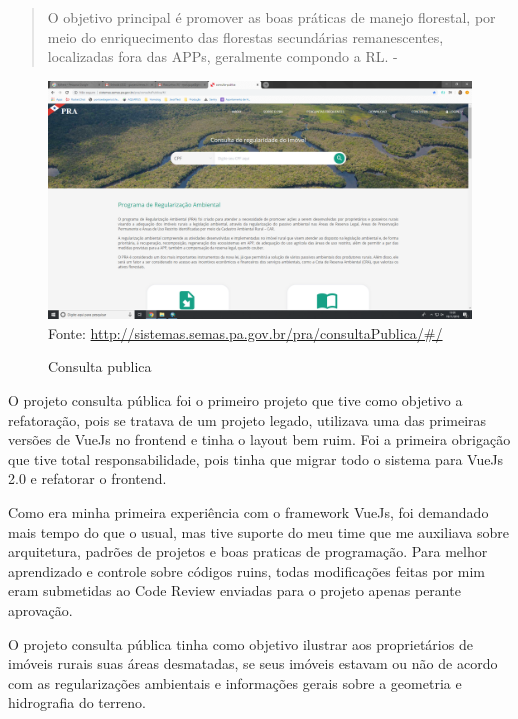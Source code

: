 \begin{quote}
    O objetivo principal é promover as boas
    práticas de manejo florestal, por meio do enriquecimento das florestas secundárias
    remanescentes, localizadas fora das APPs, geralmente compondo a RL. - \cite{de2015cadastro}
\end{quote}
\begin{figure}[H]
\centering
\caption{Consulta publica} %
\includegraphics[scale=0.22]{consulta-publica}\\  %
{\small Fonte: \url{http://sistemas.semas.pa.gov.br/pra/consultaPublica/#/}} %
\label{fig:exemplo} %
\end{figure}

O projeto consulta pública foi o primeiro projeto que tive como objetivo a refatoração, pois se tratava de um projeto legado, utilizava uma das primeiras versões de VueJs no frontend e tinha o layout bem ruim.
Foi a primeira obrigação que tive total responsabilidade, pois tinha que migrar todo o sistema para VueJs 2.0 e refatorar o frontend.

Como era minha primeira experiência com o framework VueJs, foi demandado mais tempo do que o usual, mas tive suporte do meu time que me auxiliava sobre arquitetura, padrões de projetos e boas praticas de programação.
Para melhor aprendizado e controle sobre códigos ruins, todas modificações feitas por mim eram submetidas ao Code Review enviadas para o projeto apenas perante aprovação. 

O projeto consulta pública tinha como objetivo ilustrar aos proprietários de imóveis rurais suas áreas desmatadas, se seus imóveis estavam ou não de acordo com as regularizações ambientais e informações gerais sobre a geometria e hidrografia do terreno.

